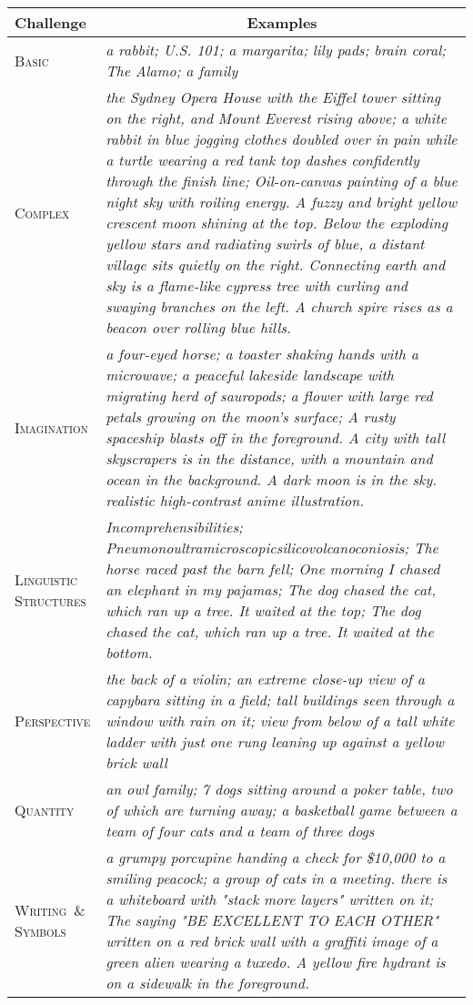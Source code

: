 \begin{table*}
\centering
\renewcommand{\arraystretch}{1.5}
{\footnotesize
\begin{tabular}{p{1.8cm}p{11.2cm}}
\toprule
Challenge & \multicolumn{1}{c}{Examples} \\
\midrule
\textsc{Basic} & \textit{a rabbit; U.S. 101; a margarita; lily pads; brain coral; The Alamo; a family} \\
\textsc{Complex} & \textit{the Sydney Opera House with the Eiffel tower sitting on the right, and Mount Everest rising above; a white rabbit in blue jogging clothes doubled over in pain while a turtle wearing a red tank top dashes confidently through the finish line; Oil-on-canvas painting of a blue night sky with roiling energy. A fuzzy and bright yellow crescent moon shining at the top. Below the exploding yellow stars and radiating swirls of blue, a distant village sits quietly on the right. Connecting earth and sky is a flame-like cypress tree with curling and swaying branches on the left. A church spire rises as a beacon over rolling blue hills.} \\
\textsc{Imagination} & \textit{a four-eyed horse; a toaster shaking hands with a microwave; a peaceful lakeside landscape with migrating herd of sauropods; a flower with large red petals growing on the moon's surface; A rusty spaceship blasts off in the foreground. A city with tall skyscrapers is in the distance, with a mountain and ocean in the background. A dark moon is in the sky. realistic high-contrast anime illustration.} \\
\textsc{Linguistic Structures} & \textit{Incomprehensibilities; Pneumonoultramicroscopicsilicovolcanoconiosis; The horse raced past the barn fell; One morning I chased an elephant in my pajamas; The dog chased the cat, which ran up a tree. It waited at the top; The dog chased the cat, which ran up a tree. It waited at the bottom.} \\
\textsc{Perspective} & \textit{the back of a violin; an extreme close-up view of a capybara sitting in a field; tall buildings seen through a window with rain on it; view from below of a tall white ladder with just one rung leaning up against a yellow brick wall} \\
\textsc{Quantity} & \textit{an owl family; 7 dogs sitting around a poker table, two of which are turning away; a basketball game between a team of four cats and a team of three dogs} \\
\textsc{Writing~\& Symbols} & \textit{a grumpy porcupine handing a check for \$10,000 to a smiling peacock; a group of cats in a meeting. there is a whiteboard with "stack more layers" written on it; The saying "BE EXCELLENT TO EACH OTHER" written on a red brick wall with a graffiti image of a green alien wearing a tuxedo. A yellow fire hydrant is on a sidewalk in the foreground.} \\

\end{tabular}}
\end{table*}
